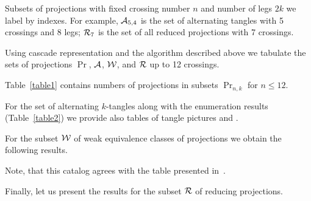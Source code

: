 \documentclass[12pt]{article}
\begin{document}
Subsets of projections with fixed crossing number $n$ and number of legs $2k$ we label by
indexes. For example, $\mathcal{A}_{5,4}$ is the set of alternating tangles with 5 crossings and 8 legs;
$\mathcal{R}_7$ is the set of all reduced projections with 7 crossings.

Using cascade representation and the algorithm described above we tabulate the sets of
projections $\Pr$, $\mathcal{A}$, $\mathcal{W}$, and $\mathcal{R}$ up to 12 crossings.

Table~\ref{table1} contains numbers of projections in subsets $\Pr_{n,k}$ for $n\le12$.



For the set of alternating $k$-tangles along with the enumeration results (Table~\ref{table2}) we
provide also tables of tangle pictures  and .





\newpage

For the subset $\mathcal{W}$ of weak equivalence classes of projections we obtain the following results.


Note, that this catalog agrees with the table presented in~\cite{Kanenobu2003}.

%

Finally, let us present the results for the subset $\mathcal{R}$ of reducing projections.




\newpage
\end{document}
